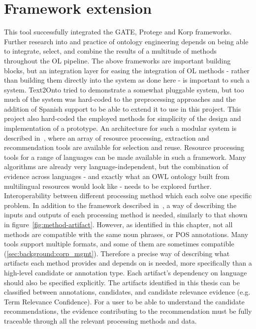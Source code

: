 \documentclass[a4paper]{report}
\begin{document}
\section{Framework extension}

This tool successfully integrated the GATE, Protege and Korp frameworks.
Further research into and practice of ontology engineering depends on being able to integrate, select, and combine the results of a multitude of methods throughout the OL pipeline.
The above frameworks are important building blocks, but an integration layer for easing the integration of OL methods - rather than building them directly into the system as done here - is important to such a system.
Text2Onto tried to demonstrate a somewhat pluggable system, but too much of the system was hard-coded to the preprocessing approaches and the addition of Spanish support to be able to extend it to use in this project.
This project also hard-coded the employed methods for simplicity of the design and implementation of a prototype.
An architecture for such a modular system is described in~\citep{Cimiano2009OL}, where an array of resource processing, extraction and recommendation tools are available for selection and reuse.
Resource processing tools for a range of languages can be made available in such a framework.
Many algorithms are already very language-independent, but the combination of evidence across languages - and exactly what an OWL ontology built from multilingual resources would look like - needs to be explored further.
Interoperability between different processing method which each solve one specific problem.
In addition to the framework described in~\citep{Cimiano2009OL}, a way of describing the inputs and outputs of each processing method is needed, similarly to that shown in figure~\ref{fig:method-artifact}.
However, as identified in this chapter, not all methods are compatible with the same noun phrases, or POS annotations.
Many tools support multiple formats, and some of them are sometimes compatible (\ref{sec:background:corp_mgmt}).
Therefore a precise way of describing what artifacts each method provides and depends on is needed, more specifically than a high-level candidate or annotation type.
Each artifact's dependency on language should also be specified explicitly.
The artifacts identified in this thesis can be classified between annotations, candidates, and candidate relevance evidence (e.g. Term Relevance Confidence).
For a user to be able to understand the candidate recommendations, the evidence contributing to the recommendation must be fully traceable through all the relevant processing methods and data.
\end{document}
